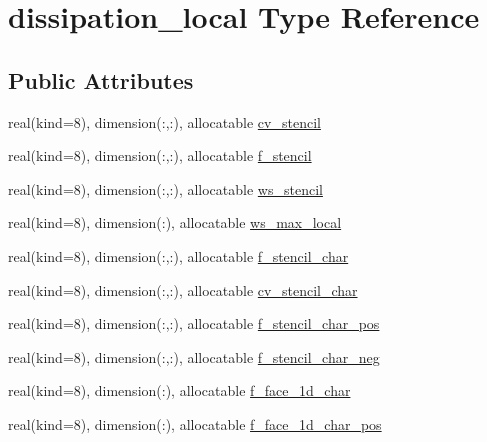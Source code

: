 \hypertarget{structnavierstokesrhsweno_1_1dissipation__local}{}\section{dissipation\+\_\+local Type Reference}
\label{structnavierstokesrhsweno_1_1dissipation__local}
\subsection*{Public Attributes}
\begin{DoxyCompactItemize}
\item 
real(kind=8), dimension(\+:,\+:), allocatable \hyperlink{structnavierstokesrhsweno_1_1dissipation__local_ade9c2cbe91755a09f90a172dd674e4e2}{cv\+\_\+stencil}
\item 
real(kind=8), dimension(\+:,\+:), allocatable \hyperlink{structnavierstokesrhsweno_1_1dissipation__local_acaf3c6c9cfc777c8c75fcf89ad523c6a}{f\+\_\+stencil}
\item 
real(kind=8), dimension(\+:,\+:), allocatable \hyperlink{structnavierstokesrhsweno_1_1dissipation__local_a974daf7d59045a31176e0584a1864dfd}{ws\+\_\+stencil}
\item 
real(kind=8), dimension(\+:), allocatable \hyperlink{structnavierstokesrhsweno_1_1dissipation__local_ade9928700968509795bd1dfaeef801e1}{ws\+\_\+max\+\_\+local}
\item 
real(kind=8), dimension(\+:,\+:), allocatable \hyperlink{structnavierstokesrhsweno_1_1dissipation__local_ae8ab145750afee96ec10369c19e7e70d}{f\+\_\+stencil\+\_\+char}
\item 
real(kind=8), dimension(\+:,\+:), allocatable \hyperlink{structnavierstokesrhsweno_1_1dissipation__local_a97db556486d557994c1e7e8cf387a6c2}{cv\+\_\+stencil\+\_\+char}
\item 
real(kind=8), dimension(\+:,\+:), allocatable \hyperlink{structnavierstokesrhsweno_1_1dissipation__local_a7d9f0771ef7936ee80a0dd2bd1cab07f}{f\+\_\+stencil\+\_\+char\+\_\+pos}
\item 
real(kind=8), dimension(\+:,\+:), allocatable \hyperlink{structnavierstokesrhsweno_1_1dissipation__local_ad09e628ab26120820023bcf02fbe1bf6}{f\+\_\+stencil\+\_\+char\+\_\+neg}
\item 
real(kind=8), dimension(\+:), allocatable \hyperlink{structnavierstokesrhsweno_1_1dissipation__local_ad9216552a914fcb2777025779fc3185c}{f\+\_\+face\+\_\+1d\+\_\+char}
\item 
real(kind=8), dimension(\+:), allocatable \hyperlink{structnavierstokesrhsweno_1_1dissipation__local_a38306f909951083c4a6101ce905644e8}{f\+\_\+face\+\_\+1d\+\_\+char\+\_\+pos}

\end{DoxyCompactItemize}
